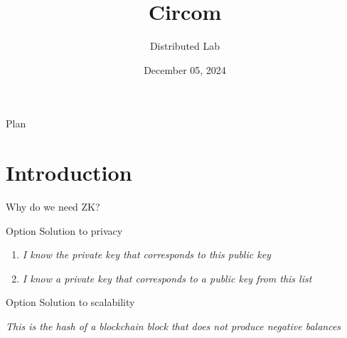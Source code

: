 \documentclass{zkdl-presentation-template}
\title[Circom]{\textbf{Circom}}
\author{Distributed Lab}
\date{December 05, 2024}
\begin{document}

    \begin{frame}{Plan}
        \tableofcontents
    \end{frame}


    \section{Introduction}

    \begin{frame}{Why do we need ZK?}

        \begin{block}{Option}
            Solution to privacy
        \end{block}        

        \begin{example}
            \begin{enumerate}
                \item \textit{I know the private key that corresponds to this public key}
                \item \textit{I know a private key that corresponds to a public key from this list}
            \end{enumerate}
        \end{example}

        \begin{block}{Option}
            Solution to scalability
        \end{block}

        \begin{example}
            \textit{This is the hash of a blockchain block that does not produce negative balances}
        \end{example}
    \end{frame}
\end{document}
